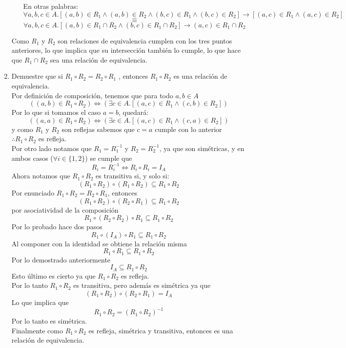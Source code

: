 \documentclass[letter]{article}
\begin{document}
\begin{pregunta}{1}
\begin{enumerate}
\begin{itemize}
		En otras palabras:
		$$\forall a,b,c \in A. [(a,b)\in R_1 \wedge (a,b)\in R_2 \wedge (b,c)\in R_1 \wedge (b,c)\in R_2]\rightarrow [(a,c)\in R_1 \wedge (a,c) \in R_2]$$
		$$\equiv$$
		$$\forall a,b,c\in A. [(a,b)\in R_1\cap R_2 \wedge (b,c)\in R_1\cap R_2] \rightarrow (a,c)\in R_1\cap R_2$$
		\end{itemize}
		Como $R_1$ y $R_2$ son relaciones de equivalencia cumplen con los tres puntos anteriores, lo que implica que su intersección también lo cumple, lo que hace que $R_1\cap R_2$ sea una relación de equivalencia.
		\item Demuestre que si $R_1 \circ R_2=R_2 \circ R_1 $ , entonces $R_1 \circ R_2$ es una relación de equivalencia.\\
		
		Por definición de composición, tenemos  que para todo $a,b\in A$
		$$((a,b)\in R_1\circ R_2) \Leftrightarrow (\exists c \in A. [(a,c)\in R_1 \wedge (c,b)\in R_2])$$
		Por lo que si tomamos el caso $a=b$, quedará:
		$$((a,a)\in R_1\circ R_2) \Leftrightarrow (\exists c \in A. [(a,c)\in R_1 \wedge (c,a)\in R_2])$$
		y como $R_1$ y $R_2$ son reflejas sabemos que $c=a$ cumple con lo anterior\\
$\therefore R_1\circ R_2$ es refleja.\\
		
		Por otro lado notamos que $R_1 = R_1^{-1}$ y $R_2 = R_2^{-1}$, ya que son simétricas, y en ambos casos ($\forall i \in \{1,2\}$) se cumple que 
		$$R_i = R_i^{-1}\Leftrightarrow R_i\circ R_i = I_A$$
		Ahora notamos que $R_1\circ R_2$ es transitiva si, y solo si:
		$$(R_1\circ R_2)\circ (R_1\circ R_2)\subseteq R_1\circ R_2$$
		Por enunciado $R_1\circ R_2 =R_2\circ R_1$, entonces
		$$(R_1\circ R_2)\circ (R_2\circ R_1)\subseteq R_1\circ R_2$$
		por asociatividad de la composición
		$$R_1\circ (R_2\circ R_2)\circ R_1\subseteq R_1\circ R_2$$
		Por lo probado hace dos pasos 
		$$R_1\circ (I_A)\circ R_1\subseteq R_1\circ R_2$$
		Al componer con la identidad se obtiene la relación misma
		$$R_1\circ R_1\subseteq R_1\circ R_2$$
		Por lo demostrado anteriormente
		$$I_A \subseteq R_1\circ R_2$$
		Esto último es cierto ya que $R_1\circ R_2$ es refleja. \\
		Por lo tanto $R_1\circ R_2$ es transitiva, pero además es simétrica ya que 
		$$ (R_1\circ R_2)\circ (R_2\circ R_1)=I_A$$
		Lo que implica que 
		$$R_1\circ R_2 = (R_1\circ R_2)^{-1}$$
		Por lo tanto es simétrica.\\
		
		Finalmente como $R_1\circ R_2$ es refleja, simétrica y transitiva, entonces es una relación de equivalencia.
		
		\end{enumerate}
		
	\end{pregunta}
	
\end{document}

